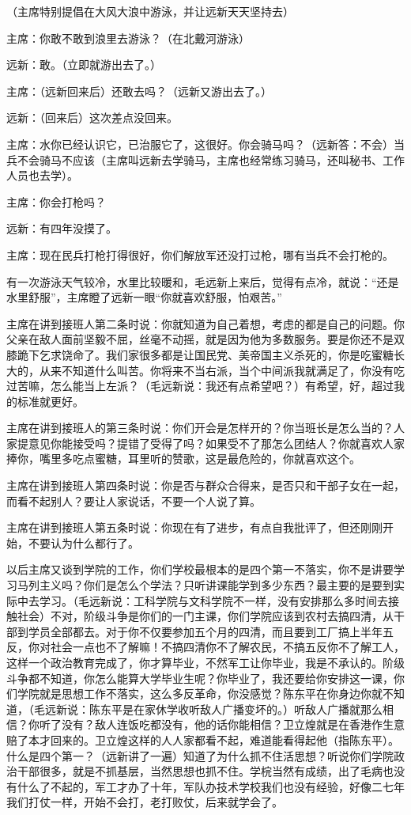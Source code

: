 （主席特别提倡在大风大浪中游泳，并让远新天天坚持去）

主席：你敢不敢到浪里去游泳？（在北戴河游泳）

远新：敢。（立即就游出去了。）

主席：（远新回来后）还敢去吗？（远新又游出去了。）

远新：（回来后）这次差点没回来。

主席：水你已经认识它，已治服它了，这很好。你会骑马吗？（远新答：不会）当兵不会骑马不应该（主席叫远新去学骑马，主席也经常练习骑马，还叫秘书、工作人员也去学）。

主席：你会打枪吗？

远新：有四年没摸了。

主席：现在民兵打枪打得很好，你们解放军还没打过枪，哪有当兵不会打枪的。

有一次游泳天气较冷，水里比较暖和，毛远新上来后，觉得有点冷，就说：“还是水里舒服”，主席瞪了远新一眼“你就喜欢舒服，怕艰苦。”

主席在讲到接班人第二条时说：你就知道为自己着想，考虑的都是自己的问题。你父亲在敌人面前坚毅不屈，丝毫不动摇，就是因为他为多数服务。要是你还不是双膝跪下乞求饶命了。我们家很多都是让国民党、美帝国主义杀死的，你是吃蜜糖长大的，从来不知道什么叫苦。你将来不当右派，当个中间派我就满足了，你没有吃过苦嘛，怎么能当上左派？（毛远新说：我还有点希望吧？）有希望，好，超过我的标准就更好。

主席在讲到接班人的第三条时说：你们开会是怎样开的？你当班长是怎么当的？人家提意见你能接受吗？提错了受得了吗？如果受不了那怎么团结人？你就喜欢人家捧你，嘴里多吃点蜜糖，耳里听的赞歌，这是最危险的，你就喜欢这个。

主席在讲到接班人第四条时说：你是否与群众合得来，是否只和干部子女在一起，而看不起别人？要让人家说话，不要一个人说了算。

主席在讲到接班人第五条时说：你现在有了进步，有点自我批评了，但还刚刚开始，不要认为什么都行了。

以后主席又谈到学院的工作，你们学校最根本的是四个第一不落实，你不是讲要学习马列主义吗？你们是怎么个学法？只听讲课能学到多少东西？最主要的是要到实际中去学习。（毛远新说：工科学院与文科学院不一样，没有安排那么多时间去接触社会）不对，阶级斗争是你们的一门主课，你们学院应该到农村去搞四清，从干部到学员全部都去。对于你不仅要参加五个月的四清，而且要到工厂搞上半年五反，你对社会一点也不了解嘛！不搞四清你不了解农民，不搞五反你不了解工人，这样一个政治教育完成了，你才算毕业，不然军工让你毕业，我是不承认的。阶级斗争都不知道，你怎么能算大学毕业生呢？你毕业了，我还要给你安排这一课，你们学院就是思想工作不落实，这么多反革命，你没感觉？陈东平在你身边你就不知道，（毛远新说：陈东平是在家休学收听敌人广播变坏的。）听敌人广播就那么相信？你听了没有？敌人连饭吃都没有，他的话你能相信？卫立煌就是在香港作生意赔了本才回来的。卫立煌这样的人人家都看不起，难道能看得起他（指陈东平）。什么是四个第一？（远新讲了一遍）知道了为什么抓不住活思想？听说你们学院政治干部很多，就是不抓基层，当然思想也抓不住。学梡当然有成绩，出了毛病也没有什么了不起的，军工才办了十年，军队办技术学校我们也没有经验，好像二七年我们打仗一样，开始不会打，老打败仗，后来就学会了。

